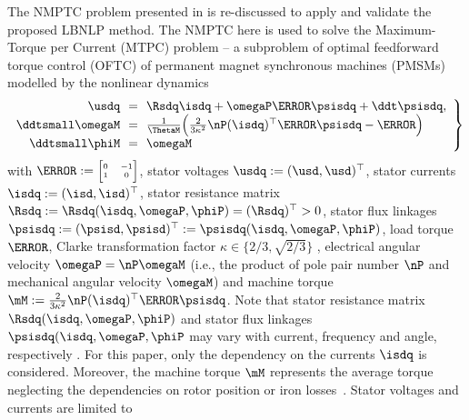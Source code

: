 \documentclass[journal]{IEEEtranTIE}
\begin{document}
The NMPTC problem presented in \cite{choi2023model} is re-discussed to apply and validate the proposed LBNLP method. The NMPTC here is used to solve the Maximum-Torque per Current (MTPC) problem -- a subproblem of optimal feedforward torque control (OFTC) \cite{2017_Eldeeb_Aunifiedtheoryforoptimalfeedforwardtorquecontrolofanisotropicsynchronousmachines} of permanent magnet synchronous machines (PMSMs) modelled by the nonlinear dynamics
% 
\begin{equation}
	\left.
	\begin{array}{rcl}
		\usdq &\!\!=\!\!& \Rsdq\isdq + \omegaP\J\psisdq+\ddt\psisdq,  \\
        \ddtsmall \omegaM &\!\!=\!\!& \tfrac{1}{\ThetaM}\Big( \tfrac{2}{3\kappa^2}\nP (\isdq)^\top\J \psisdq - \mL \Big) \\
        \ddtsmall \phiM &\!\!=\!\!& \omegaM
	\end{array}
	\right\}
	\label{eq:transformer-like FLDM}
\end{equation}
% 
with
$\J:={\tiny\begin{bmatrix}
	0 & -1 \\ 1 & 0
\end{bmatrix}}$, 
stator voltages $\usdq:=(\usd,\usd)^\top$, 
stator currents  $\isdq:=(\isd,\isd)^\top$,  
stator resistance matrix $\Rsdq:=\Rsdq(\isdq,\omegaP,\phiP) = (\Rsdq)^\top >0$,
stator flux linkages $\psisdq:=(\psisd,\psisd)^\top:=\psisdq(\isdq,\omegaP,\phiP)$,  
load torque $\mL$,
Clarke transformation factor $\kappa \in \{2/3, \sqrt{2/3}\}$ \cite[Ch.~14]{2017_Hackl_Non-identifierbasedadaptivecontrolinmechatronics:TheoryandApplication},
electrical angular velocity $\omegaP = \nP\omegaM$ (i.e., the product of pole pair number $\nP$ and  mechanical angular velocity $\omegaM$) and machine torque $\mM:=\tfrac{2}{3\kappa^2}\nP (\isdq)^\top\J \psisdq$.
Note that stator resistance matrix $\Rsdq(\isdq,\omegaP,\phiP)$ and stator flux linkages $\psisdq(\isdq,\omegaP,\phiP$ may vary with current, frequency and angle, respectively \cite{2021_Hackl_GenericLossMinimizationforNonlinearSynchronousMachinesbyAnalyticalComputationofOptimalReferenceCurrentsConsideringCopperandIronLosses}. For this paper, only the dependency on the currents $\isdq$ is considered. Moreover, the machine torque $\mM$ represents the average torque neglecting the dependencies on rotor position %
or iron losses~\cite{2023_Rossmann_NonlinearThreePhaseReluctanceSynchronousMachineModelingwithExtendedTorqueEquation}. Stator voltages and currents are limited to \cite{2021_Hackl_GenericLossMinimizationforNonlinearSynchronousMachinesbyAnalyticalComputationofOptimalReferenceCurrentsConsideringCopperandIronLosses}
\end{document}
